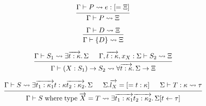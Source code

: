 \documentclass[lualatex,12pt,unicode]{article}
\begin{document}
\pagestyle{empty}

\[
    \begin{prooftree}
        \hypo{\Gamma \vdash P \rightsquigarrow e: [= \Xi]}
        \infer1{\Gamma \vdash P \rightsquigarrow \Xi}
    \end{prooftree}
\]

\[
    \begin{prooftree}
        \hypo{\Gamma \vdash D \rightsquigarrow \Xi}
        \infer1{\Gamma \vdash \{D\} \rightsquigarrow \Xi}
    \end{prooftree}
\]

\[
    \begin{prooftree}
        \hypo{\Gamma \vdash S_1 \rightsquigarrow \exists \overrightarrow{t: \kappa}\ldotp \Sigma}
        \hypo{\Gamma, \overrightarrow{t: \kappa}, x_X: \Sigma \vdash S_2 \rightsquigarrow \Xi}
        \infer2{\Gamma \vdash (X: S_1) \to S_2 \rightsquigarrow \forall \overrightarrow{t: \kappa}\ldotp \Sigma \to \Xi}
    \end{prooftree}
\]

\[
    \begin{prooftree}
        \hypo{\Gamma \vdash S \rightsquigarrow \exists \overrightarrow{t_1: \kappa_1} t: \kappa \overrightarrow{t_2: \kappa_2}\ldotp \Sigma}
        \hypo{\Sigma.\overrightarrow{l_X} = [= t: \kappa]}
        \hypo{\Sigma \vdash T: \kappa \rightsquigarrow \tau}
        \infer3{\Gamma \vdash S\; \mathrm{where}\; \mathrm{type}\; \overrightarrow{X} = T \rightsquigarrow \exists \overrightarrow{t_1: \kappa_1} \overrightarrow{t_2: \kappa_2}\ldotp \Sigma[t \leftarrow \tau]}
    \end{prooftree}
\]
\end{document}

